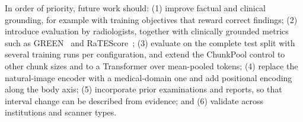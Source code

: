 \documentclass[conference]{IEEEtran}
\begin{document}
In order of priority, future work should: (1) improve factual and clinical
grounding, for example with training objectives that reward correct findings;
(2) introduce evaluation by radiologists, together with clinically grounded
metrics such as GREEN~\cite{green} and RaTEScore~\cite{ratescore};
(3) evaluate on the complete test split with several training runs per
configuration, and extend the ChunkPool control to other chunk sizes and to a
Transformer over mean-pooled tokens; (4) replace the
natural-image encoder with a medical-domain one and add positional encoding
along the body axis; (5) incorporate prior examinations and reports, so that
interval change can be described from evidence; and (6) validate across
institutions and scanner types.



\end{document}
